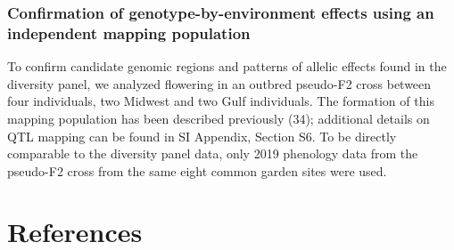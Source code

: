 \documentclass[
  9pt,
  twocolumn,
  twoside]{pnas-new}
\begin{document}
\subsubsection{Confirmation of genotype-by-environment effects using an
independent mapping
population}\label{confirmation-of-genotype-by-environment-effects-using-an-independent-mapping-population}

To confirm candidate genomic regions and patterns of allelic effects
found in the diversity panel, we analyzed flowering in an outbred
pseudo-F2 cross between four individuals, two Midwest and two Gulf
individuals. The formation of this mapping population has been described
previously (34); additional details on QTL mapping can be found in SI
Appendix, Section S6. To be directly comparable to the diversity panel
data, only 2019 phenology data from the pseudo-F2 cross from the same
eight common garden sites were used.

\section{References}\label{references}

\bibsplit[2]
\end{document}
